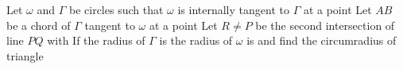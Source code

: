 Let $\omega$ and $\Gamma$ be circles such that $\omega$ is internally tangent to $\Gamma$ at a point  Let $AB$ be a chord of $\Gamma$ tangent to $\omega$ at a point  Let $R\neq P$ be the second intersection of line $PQ$ with  If the radius of $\Gamma$ is  the radius of $\omega$ is  and  find the circumradius of triangle 